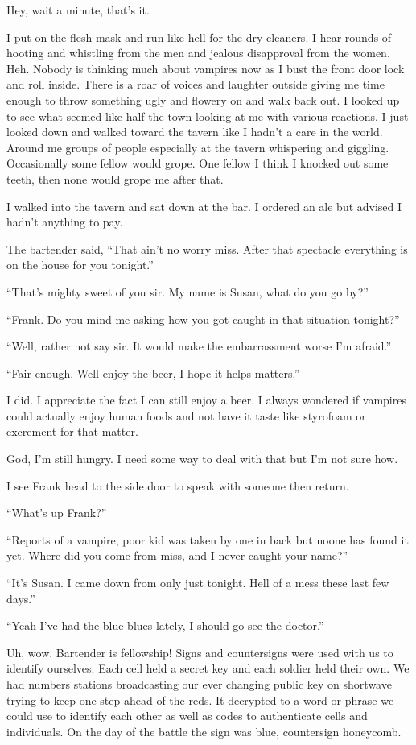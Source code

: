 Hey, wait a minute, that's it.

I put on the flesh mask and run like hell for the dry cleaners. I hear rounds of hooting and whistling from the men and jealous disapproval from the women. Heh. Nobody is thinking much about vampires now as I bust the front door lock and roll inside. There is a roar of voices and laughter outside giving me time enough to throw something ugly and flowery on and walk back out. I looked up to see what seemed like half the town looking at me with various reactions. I just looked down and walked toward the tavern like I hadn't a care in the world. Around me groups of people especially at the tavern whispering and giggling. Occasionally some fellow would grope. One fellow I think I knocked out some teeth, then none would grope me after that.

I walked into the tavern and sat down at the bar. I ordered an ale but advised I hadn't anything to pay.

The bartender said, ``That ain't no worry miss. After that spectacle everything is on the house for you tonight.''

``That's mighty sweet of you sir. My name is Susan, what do you go by?''

``Frank. Do you mind me asking how you got caught in that situation tonight?''

``Well, rather not say sir. It would make the embarrassment worse I'm afraid.''

``Fair enough. Well enjoy the beer, I hope it helps matters.''

I did. I appreciate the fact I can still enjoy a beer. I always wondered if vampires could actually enjoy human foods and not have it taste like styrofoam or excrement for that matter.

God, I'm still hungry. I need some way to deal with that but I'm not sure how.

I see Frank head to the side door to speak with someone then return.

``What's up Frank?''

``Reports of a vampire, poor kid was taken by one in back but noone has found it yet. Where did you come from miss, and I never caught your name?''

``It's Susan. I came down from \chichenitza only just tonight. Hell of a mess these last few days.''

``Yeah I've had the blue blues lately, I should go see the doctor.''

Uh, wow. Bartender is fellowship! Signs and countersigns were used with us to identify ourselves. Each cell held a secret key and each soldier held their own. We had numbers stations broadcasting our ever changing public key on shortwave trying to keep one step ahead of the reds. It decrypted to a word or phrase we could use to identify each other as well as codes to authenticate cells and individuals. On the day of the battle the sign was blue, countersign honeycomb.

